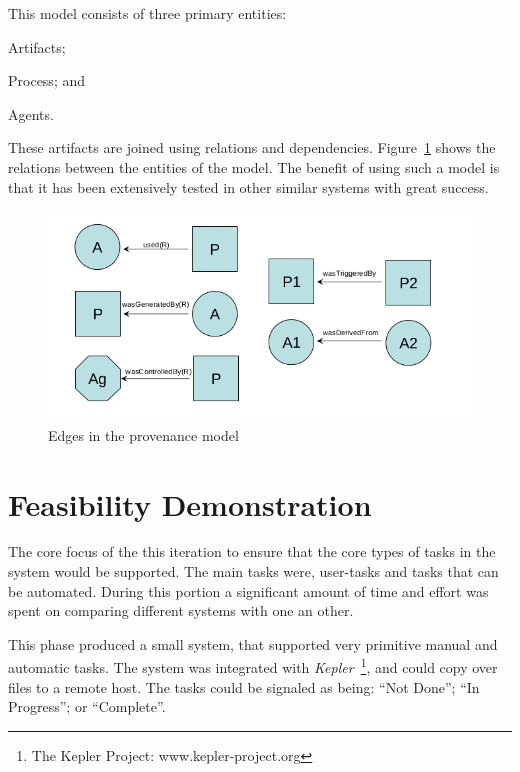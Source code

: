 \documentclass[12pt,a4paper]{report}
\begin{document}
\begin{description}
        This model consists of three primary entities: \begin{inparaenum}[(i)]
        \item Artifacts; \item Process; and \item Agents.\end{inparaenum} These
        artifacts are joined using relations and dependencies.
        Figure~\ref{provenance}  shows the relations between the entities of
        the model. The benefit of using such a model is that it has been
        extensively tested in other similar systems with great success.
        \begin{figure}[!hb]
            \begin{center}
                \includegraphics[scale=0.5]{figures/provenance_edges.png}
            \end{center}
            \caption{Edges in the provenance model}
            \label{provenance}
        \end{figure}
\end{description}

\section{Feasibility Demonstration\label{feasibility}}

The core focus of the this iteration to ensure that the core types of tasks
in the system would be supported. The main tasks were, user-tasks and tasks
that can be automated. During this portion a significant amount of time and
effort was spent on comparing different systems with one an other.

This phase produced a small system, that supported very primitive manual and automatic
tasks. The system was integrated with \emph{Kepler}~\footnote{
The Kepler Project: www.kepler-project.org }, and could copy over files to a remote
host. The tasks could be signaled as being: ``Not Done''; ``In Progress''; or ``Complete''.
\end{document}
